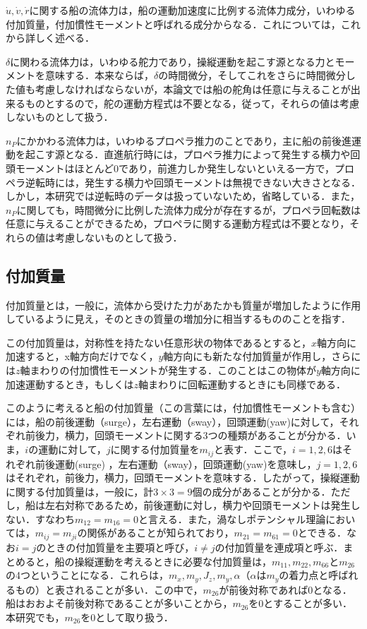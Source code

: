 $\dot{u},\dot{v},\dot{r}$に関する船の流体力は，船の運動加速度に比例する流体力成分，いわゆる付加質量，付加慣性モーメントと呼ばれる成分からなる．これについては，これから詳しく述べる．

$\delta$に関わる流体力は，いわゆる舵力であり，操縦運動を起こす源となる力とモーメントを意味する．本来ならば，$\delta$の時間微分，そしてこれをさらに時間微分した値も考慮しなければならないが，本論文では船の舵角は任意に与えることが出来るものとするので，舵の運動方程式は不要となる，従って，それらの値は考慮しないものとして扱う．

$n_P$にかかわる流体力は，いわゆるプロペラ推力のことであり，主に船の前後進運動を起こす源となる．直進航行時には，プロペラ推力によって発生する横力や回頭モーメントはほとんど0であり，前進力しか発生しないといえる一方で，プロペラ逆転時には，発生する横力や回頭モーメントは無視できない大きさとなる．しかし，本研究では逆転時のデータは扱っていないため，省略している．また，$n_P$に関しても，時間微分に比例した流体力成分が存在するが，プロペラ回転数は任意に与えることができるため，プロペラに関する運動方程式は不要となり，それらの値は考慮しないものとして扱う．

\subsection{付加質量}

付加質量とは，一般に，流体から受けた力があたかも質量が増加したように作用しているように見え，そのときの質量の増加分に相当するもののことを指す．

この付加質量は，対称性を持たない任意形状の物体であるとすると，$x$軸方向に加速すると，x軸方向だけでなく，$y$軸方向にも新たな付加質量が作用し，さらには$z$軸まわりの付加慣性モーメントが発生する．このことはこの物体が$y$軸方向に加速運動するとき，もしくは$z$軸まわりに回転運動するときにも同様である．

このように考えると船の付加質量（この言葉には，付加慣性モーメントも含む）には，船の前後運動（surge），左右運動（sway），回頭運動(yaw)に対して，それぞれ前後力，横力，回頭モーメントに関する3つの種類があることが分かる．いま，$i$の運動に対して，$j$に関する付加質量を$m_{ij}$と表す．ここで，$i=1,2,6$はそれぞれ前後運動(surge) ，左右運動（sway），回頭運動(yaw)を意味し，$j=1,2,6$はそれぞれ，前後力，横力，回頭モーメントを意味する．したがって，操縦運動に関する付加質量は，一般に，計$3×3=9$個の成分があることが分かる．ただし，船は左右対称であるため，前後運動に対し，横力や回頭モーメントは発生しない．すなわち$m_{12}=m_{16}=0$と言える．また，渦なしポテンシャル理論においては，$m_{ij}=m_{ji}$の関係があることが知られており，$m_{21}=m_{61}=0$とできる．なお$i=j$のときの付加質量を主要項と呼び，$i≠j$の付加質量を連成項と呼ぶ．まとめると，船の操縦運動を考えるときに必要な付加質量は，$m_{11},m_{22},m_{66}とm_{26}$の4つということになる．これらは，$m_x,m_y,J_z,m_y ,\alpha$（$\alpha$は$m_y$の着力点と呼ばれるもの）と表されることが多い．この中で，$m_{26}$が前後対称であれば$0$となる．船はおおよそ前後対称であることが多いことから，$m_{26}$を$0$とすることが多い．本研究でも，$m_{26}$を$0$として取り扱う．

